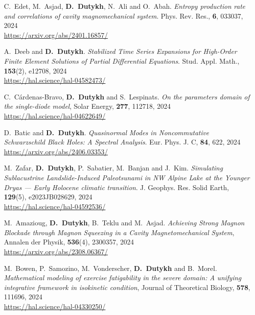 \begin{etaremune}
  \item C.~Edet, M.~Asjad, \textbf{D.~Dutykh}, N.~Ali and O.~Abah. \textit{Entropy production rate and correlations of cavity magnomechanical system}. Phys. Rev. Res., \textbf{6}, 033037, 2024 \\ %
  \url{https://arxiv.org/abs/2401.16857/}

  \item A.~Deeb and \textbf{D.~Dutykh}. \textit{Stabilized Time Series Expansions for High-Order Finite Element Solutions of Partial Differential Equations}. Stud. Appl. Math., \textbf{153}(2), e12708, 2024 \\ %
  \url{https://hal.science/hal-04582473/}
  
  \item C.~C\'ardenas-Bravo, \textbf{D.~Dutykh} and S.~Lespinats. \textit{On the parameters domain of the single-diode model}, Solar Energy, \textbf{277}, 112718, 2024 \\ %
  \url{https://hal.science/hal-04622649/}
  
  \item D.~Batic and \textbf{D.~Dutykh}. \textit{Quasinormal Modes in Noncommutative Schwarzschild Black Holes: A Spectral Analysis}. Eur. Phys. J. C, \textbf{84}, 622, 2024 \\ %
  \url{https://arxiv.org/abs/2406.03353/}

  \item M.~Zafar, \textbf{D.~Dutykh}, P.~Sabatier, M.~Banjan and J.~Kim. \textit{Simulating Sublacustrine Landslide-Induced Paleotsunami in NW Alpine Lake at the Younger Dryas --- Early Holocene climatic transition}. J. Geophys. Res. Solid Earth, \textbf{129}(5), e2023JB028629, 2024 \\ %
  \url{https://hal.science/hal-04592536/}
  
  \item M.~Amazioug, \textbf{D.~Dutykh}, B.~Teklu and M.~Asjad. \textit{Achieving Strong Magnon Blockade through Magnon Squeezing in a Cavity Magnetomechanical System}, Annalen der Physik, \textbf{536}(4), 2300357, 2024 \\ %
  \url{https://arxiv.org/abs/2308.06367/}
  
  \item M.~Bowen, P.~Samozino, M.~Vonderscher, \textbf{D.~Dutykh} and B.~Morel. \textit{Mathematical modeling of exercise fatigability in the severe domain: A unifying integrative framework in isokinetic condition}, Journal of Theoretical Biology, \textbf{578}, 111696, 2024 \\ %
  \url{https://hal.science/hal-04330250/}
  

\end{etaremune}

